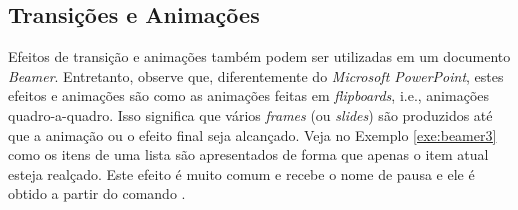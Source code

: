 \subsection{Transições e Animações}
\label{sec:trans_anima}

Efeitos de transição e animações também podem ser utilizadas em um documento \textit{Beamer}. Entretanto, observe que, diferentemente do \textit{Microsoft PowerPoint}, estes efeitos e animações são como as animações feitas em \textit{flipboards}, i.e., animações quadro-a-quadro. Isso significa que vários \textit{frames} (ou \textit{slides}) são produzidos até que a animação ou o efeito final seja alcançado. Veja no Exemplo \ref{exe:beamer3} como os itens de uma lista são apresentados de forma que apenas o item atual esteja realçado. Este efeito é muito comum e recebe o nome de pausa e ele é obtido a partir do comando \texttt{\pause}.



